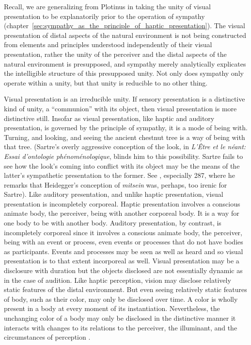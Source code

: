 Recall, we are generalizing from Plotinus in taking the unity of visual presentation to be explanatorily prior to the operation of sympathy (chapter~\ref{sec:sympathy_as_the_principle_of_haptic_presentation}). The visual presentation of distal aspects of the natural environment is not being constructed from elements and principles understood independently of their visual presentation, rather the unity of the perceiver and the distal aspects of the natural environment is presupposed, and sympathy merely analytically explicates the intelligible structure of this presupposed unity. Not only does sympathy only operate within a unity, but that unity is reducible to no other thing.

Visual presentation is an irreducible unity. If sensory presentation is a distinctive kind of unity, a ``communion'' with its object, then visual presentation is more distinctive still. Insofar as visual presentation, like haptic and auditory presentation, is governed by the principle of sympathy, it is a mode of being with. Turning, and looking, and seeing the ancient chestnut tree is a way of being with that tree. (Sartre's overly aggressive conception of the look, in \emph{L'Être et le néant: Essai d'ontologie phénoménologique}, blinds him to this possibility. Sartre fails to see how the look's coming into conflict with its object may be the means of the latter's sympathetic presentation to the former. See \citealt[chapter 5]{Jay:1994aa}, especially 287, where he remarks that Heidegger's conception of \emph{mitsein} was, perhaps, too irenic for Sartre). Like auditory presentation, and unlike haptic presentation, visual presentation is incompletely corporeal. Haptic presentation involves a conscious animate body, the perceiver, being with another corporeal body. It is a way for one body to be with another body. Auditory presentation, by contrast, is incompletely corporeal since it involves a conscious animate body, the perceiver, being with an event or process, even events or processes that do not have bodies as participants. Events and processes may be seen as well as heard and so visual presentation is to that extent incorporeal as well. Visual presentation may be a disclosure with duration but the objects disclosed are not essentially dynamic as in the case of audition. Like haptic perception, vision may disclose relatively static features of the distal environment. But even seeing relatively static features of body, such as their color, may only be disclosed over time. A color is wholly present in a body at every moment of its instantiation. Nevertheless, the unchanging color of a body may only be disclosed in the distinctive manner it interacts with changes to its relations to the perceiver, the illuminant, and the circumstances of perception \citep{Broackes:1997pa,Noe:2004fk,Matthen:2005md}.

